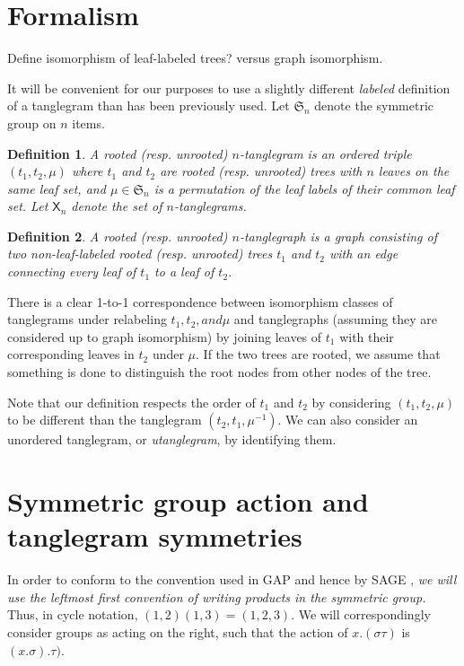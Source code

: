 \documentclass{amsart}
\newtheorem{definition}{Definition}
\newcommand{\fS}{\mathfrak S}
\newcommand{\pairing}{\mu}
\newcommand{\tangle}{\mathsf{X}}
\begin{document}
\section{Formalism}
Define isomorphism of leaf-labeled trees?
versus graph isomorphism.

It will be convenient for our purposes to use a slightly different \emph{labeled} definition of a tanglegram than has been previously used.
Let $\fS_n$ denote the symmetric group on $n$ items.
\begin{definition}
\label{def:tanglegram}
A rooted (resp. unrooted) $n$-\emph{tanglegram} is an ordered triple $(t_1, t_2, \pairing)$ where $t_1$ and $t_2$ are rooted (resp. unrooted) trees with $n$ leaves on the same leaf set, and $\pairing \in \fS_n$ is a permutation of the leaf labels of their common leaf set.
Let $\tangle_n$ denote the set of $n$-tanglegrams.
\end{definition}
\begin{definition}
\label{def:tanglegraph}
A rooted (resp. unrooted) $n$-\emph{tanglegraph} is a graph consisting of two non-leaf-labeled rooted (resp. unrooted) trees $t_1$ and $t_2$ with an edge connecting every leaf of $t_1$ to a leaf of $t_2$.
\end{definition}
There is a clear 1-to-1 correspondence between isomorphism classes of tanglegrams under relabeling $t_1, t_2, and \pairing$ and tanglegraphs (assuming they are considered up to graph isomorphism) by joining leaves of $t_1$ with their corresponding leaves in $t_2$ under $\pairing$.
If the two trees are rooted, we assume that something is done to distinguish the root nodes from other nodes of the tree.

Note that our definition respects the order of $t_1$ and $t_2$ by considering $(t_1, t_2, \pairing)$ to be different than the tanglegram $(t_2, t_1, \pairing^{-1})$.
We can also consider an unordered tanglegram, or \emph{utanglegram}, by identifying them.


\section{Symmetric group action and tanglegram symmetries}
In order to conform to the convention used in GAP \cite{GAP4} and hence by SAGE \cite{SteinJoyner2005}, \emph{we will use the leftmost first convention of writing products in the symmetric group.}
Thus, in cycle notation, $(1,2) (1,3) = (1,2,3)$.
We will correspondingly consider groups as acting on the right, such that the action of $x.(\sigma \tau)$ is $(x.\sigma) . \tau)$.
\end{document}
